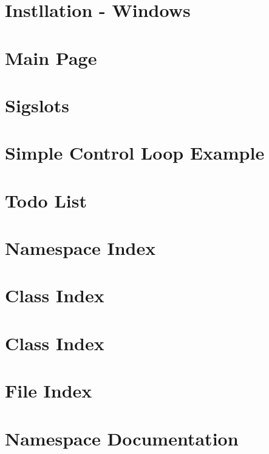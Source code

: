 \documentclass[a4paper]{book}
\begin{document}
\chapter{\-Instllation -\/ \-Windows}
\label{koInstallationWindowsGuide}

\chapter{\-Main \-Page}
\label{koMainPage}

\chapter{\-Sigslots}
\label{koSigslotsGuide}

\chapter{\-Simple \-Control \-Loop \-Example}
\label{koSimpleExample}

\chapter{\-Todo \-List}
\label{todo}

\chapter{\-Namespace \-Index}

\chapter{\-Class \-Index}

\chapter{\-Class \-Index}

\chapter{\-File \-Index}

\chapter{\-Namespace \-Documentation}


\end{document}
